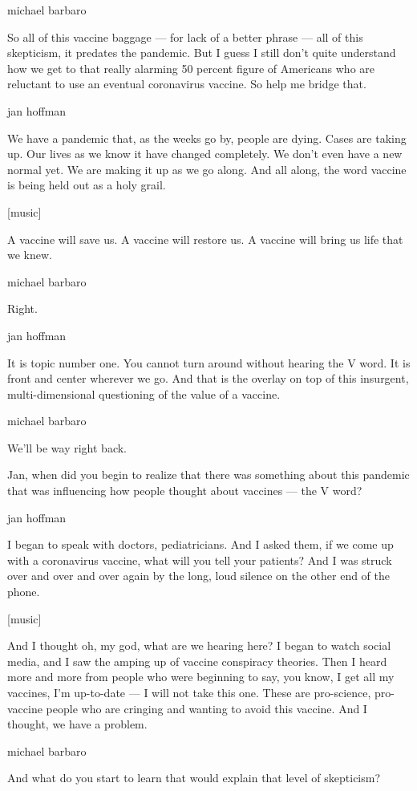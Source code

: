 michael barbaro

So all of this vaccine baggage --- for lack of a better phrase --- all
of this skepticism, it predates the pandemic. But I guess I still don't
quite understand how we get to that really alarming 50 percent figure of
Americans who are reluctant to use an eventual coronavirus vaccine. So
help me bridge that.

jan hoffman

We have a pandemic that, as the weeks go by, people are dying. Cases are
taking up. Our lives as we know it have changed completely. We don't
even have a new normal yet. We are making it up as we go along. And all
along, the word vaccine is being held out as a holy grail.

{[}music{]}

A vaccine will save us. A vaccine will restore us. A vaccine will bring
us life that we knew.

michael barbaro

Right.

jan hoffman

It is topic number one. You cannot turn around without hearing the V
word. It is front and center wherever we go. And that is the overlay on
top of this insurgent, multi-dimensional questioning of the value of a
vaccine.

michael barbaro

We'll be way right back.

Jan, when did you begin to realize that there was something about this
pandemic that was influencing how people thought about vaccines --- the
V word?

jan hoffman

I began to speak with doctors, pediatricians. And I asked them, if we
come up with a coronavirus vaccine, what will you tell your patients?
And I was struck over and over and over again by the long, loud silence
on the other end of the phone.

{[}music{]}

And I thought oh, my god, what are we hearing here? I began to watch
social media, and I saw the amping up of vaccine conspiracy theories.
Then I heard more and more from people who were beginning to say, you
know, I get all my vaccines, I'm up-to-date --- I will not take this
one. These are pro-science, pro-vaccine people who are cringing and
wanting to avoid this vaccine. And I thought, we have a problem.

michael barbaro

And what do you start to learn that would explain that level of
skepticism?


